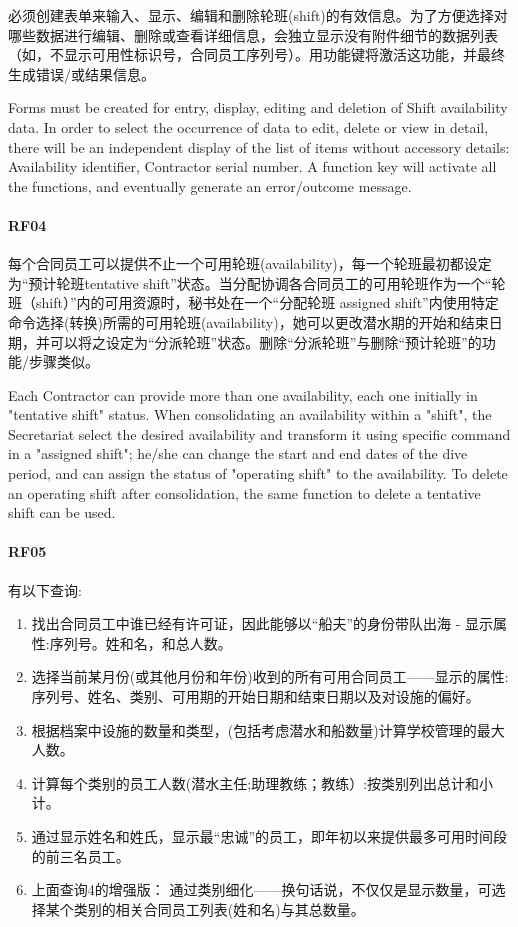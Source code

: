 必须创建表单来输入、显示、编辑和删除轮班(shift)的有效信息。为了方便选择对哪些数据进行编辑、删除或查看详细信息，会独立显示没有附件细节的数据列表（如，不显示可用性标识号，合同员工序列号）。用功能键将激活这功能，并最终生成错误/或结果信息。

Forms must be created for entry, display, editing and deletion of Shift
availability data. In order to select the occurrence of data to edit,
delete or view in detail, there will be an independent display of the
list of items without accessory details: Availability identifier,
Contractor serial number. A function key will activate all the
functions, and eventually generate an error/outcome message.

\hypertarget{rf04}{%
\paragraph{RF04}\label{rf04}}

每个合同员工可以提供不止一个可用轮班(availability)，每一个轮班最初都设定为``预计轮班tentative
shift''状态。当分配协调各合同员工的可用轮班作为一个``轮班（shift）''内的可用资源时，秘书处在一个``分配轮班
assigned
shift''内使用特定命令选择(转换)所需的可用轮班(availability)，她可以更改潜水期的开始和结束日期，并可以将之设定为``分派轮班''状态。删除``分派轮班''与删除``预计轮班''的功能/步骤类似。

Each Contractor can provide more than one availability, each one
initially in "tentative shift" status. When consolidating an
availability within a "shift", the Secretariat select the desired
availability and transform it using specific command in a "assigned
shift"; he/she can change the start and end dates of the dive period,
and can assign the status of "operating shift" to the availability. To
delete an operating shift after consolidation, the same function to
delete a tentative shift can be used.

\hypertarget{rf05}{%
\paragraph{RF05}\label{rf05}}

有以下查询:

\begin{enumerate}
\tightlist
\item
  找出合同员工中谁已经有许可证，因此能够以``船夫''的身份带队出海 -
  显示属性:序列号。姓和名，和总人数。
\item
  选择当前某月份(或其他月份和年份)收到的所有可用合同员工------显示的属性:序列号、姓名、类别、可用期的开始日期和结束日期以及对设施的偏好。
\item
  根据档案中设施的数量和类型，(包括考虑潜水和船数量)计算学校管理的最大人数。
\item
  计算每个类别的员工人数(潜水主任;助理教练；教练）:按类别列出总计和小计。
\item
  通过显示姓名和姓氏，显示最``忠诚''的员工，即年初以来提供最多可用时间段的前三名员工。
\item
  上面查询4的增强版：
  通过类别细化------换句话说，不仅仅是显示数量，可选择某个类别的相关合同员工列表(姓和名)与其总数量。
\end{enumerate}

